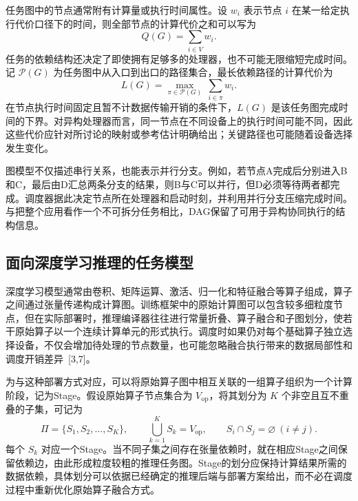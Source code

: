 任务图中的节点通常附有计算量或执行时间属性。设 $w_i$ 表示节点 $i$ 在某一给定执行代价口径下的时间，则全部节点的计算代价之和可以写为
\begin{equation}\label{eq:ch2-work}
  Q(G)=\sum_{i\in V}w_i.
\end{equation}
任务的依赖结构还决定了即使拥有足够多的处理器，也不可能无限缩短完成时间。记 $\mathcal{P}(G)$ 为任务图中从入口到出口的路径集合，最长依赖路径的计算代价为
\begin{equation}\label{eq:ch2-path}
  L(G)=\max_{\pi\in\mathcal{P}(G)}\ \sum_{i\in\pi}w_i.
\end{equation}
在节点执行时间固定且暂不计数据传输开销的条件下，$L(G)$ 是该任务图完成时间的下界。对异构处理器而言，同一节点在不同设备上的执行时间可能不同，因此这些代价应针对所讨论的映射或参考估计明确给出；关键路径也可能随着设备选择发生变化。

图模型不仅描述串行关系，也能表示并行分支。例如，若节点A完成后分别进入B和C，最后由D汇总两条分支的结果，则B与C可以并行，但D必须等待两者都完成。调度器据此决定节点所在处理器和启动时刻，并利用并行分支压缩完成时间。与把整个应用看作一个不可拆分任务相比，DAG保留了可用于异构协同执行的结构信息。

\subsection{面向深度学习推理的任务模型}

深度学习模型通常由卷积、矩阵运算、激活、归一化和特征融合等算子组成，算子之间通过张量传递构成计算图。训练框架中的原始计算图可以包含较多细粒度节点，但在实际部署时，推理编译器往往进行常量折叠、算子融合和子图划分，使若干原始算子以一个连续计算单元的形式执行。调度时如果仍对每个基础算子独立选择设备，不仅会增加待处理的节点数量，也可能忽略融合执行带来的数据局部性和调度开销差异~[3,7]。

为与这种部署方式对应，可以将原始算子图中相互关联的一组算子组织为一个计算阶段，记为Stage。假设原始算子节点集合为 $V_{\mathrm{op}}$，将其划分为 $K$ 个非空且互不重叠的子集，可记为
\begin{equation}\label{eq:ch2-partition}
  \Pi=\{S_1,S_2,\ldots,S_K\},\qquad
  \bigcup_{k=1}^{K}S_k=V_{\mathrm{op}},\qquad
  S_i\cap S_j=\varnothing\ (i\ne j).
\end{equation}
每个 $S_k$ 对应一个Stage。当不同子集之间存在张量依赖时，就在相应Stage之间保留依赖边，由此形成粒度较粗的推理任务图。Stage的划分应保持计算结果所需的数据依赖，具体划分可以依据已经确定的推理后端与部署方案给出，而不必在调度过程中重新优化原始算子融合方式。

